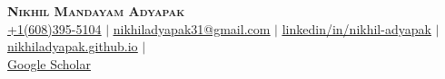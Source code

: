 \documentclass[letterpaper,11pt]{article}
\begin{document}
\vspace*{-25pt} %

\newcommand{\makeboxlabel}[1]{\fbox{#1.}\hfill}%
\newenvironment{boxlabel}
  {\begin{list}
    {\arabic{boxlblcounter}}
    {\usecounter{boxlblcounter}
     \setlength{\labelwidth}{3em}
     \setlength{\labelsep}{0em}
     \setlength{\itemsep}{2pt}
     \setlength{\leftmargin}{1.5cm}
     \setlength{\rightmargin}{2cm}
     \setlength{\itemindent}{0em} 
     \let\makelabel=\makeboxlabel
    }
  }
{\end{list}}


\begin{center}
    \textbf{\Huge \scshape Nikhil Mandayam Adyapak} \\ \vspace{2.5pt}
    \small \href{https://wa.me/917349304990?text=Hello!+I'm+<your+name>%2C+and+I've+found+you+via+your+resume.+I+am+reaching+out+because+<...>}{\underline{+1(608)395-5104}} $|$ \href{mailto:nikhiladyapak31@gmail.com}{\underline{nikhiladyapak31@gmail.com}} $|$ 
    \href{https://www.linkedin.com/in/nikhil-adyapak/}{\underline{linkedin/in/nikhil-adyapak}} $|$
    \href{https://nikhiladyapak.github.io/}{\underline{nikhiladyapak.github.io}} $|$ \\
    \href{https://scholar.google.com/citations?hl=en&user=VAOBlIMAAAAJ}{\underline{Google Scholar}}
\end{center}

\end{document}
